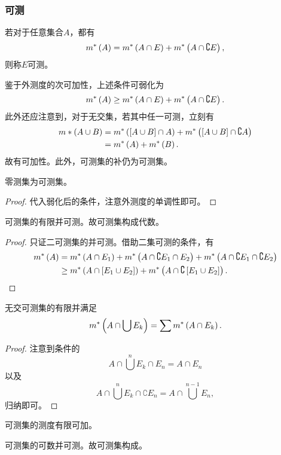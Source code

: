 \documentclass{ctexrep}
\begin{document}
  \subsubsection{\cara 可测}
  \begin{definition}
    若对于任意集合$A$，都有
    \[ m^*\left(A\right) = m^*\left(A\cap E\right)+m^*\left(A\cap\complement E\right), \]
    则称$E$可测。
  \end{definition}
  鉴于外测度的次可加性，上述条件可弱化为
  \[ m^*\left(A\right) \ge m^*\left(A\cap E\right)+m^*\left(A\cap\complement E\right). \]
  此外还应注意到，对于无交集，若其中任一可测，立刻有
  \begin{align*}
  m*\left(A\cup B\right) &= m^*\left(\left[A\cup B\right]\cap A\right)+m^*\left(\left[A\cup B\right]\cap \complement A\right)\\ &= m^*\left(A\right)+m^*\left(B\right).
  \end{align*}
  故有可加性。此外，可测集的补仍为可测集。
  \begin{theorem}
    零测集为可测集。
  \end{theorem}
  \begin{proof}
    代入弱化后的条件，注意外测度的单调性即可。
  \end{proof}
  \begin{theorem}
    可测集的有限并可测。故可测集构成代数。
  \end{theorem}
  \begin{proof}
    只证二可测集的并可测。借助二集可测的\cara 条件，有
    \begin{align*}
      m^*\left(A\right) &= m^*\left(A\cap E_1\right)+m^*\left(A\cap\complement E_1\cap E_2\right) + m^*\left(A\cap\complement E_1\cap \complement E_2\right) \\
      &\ge m^*\left(A\cap\left[E_1\cup E_2\right]\right) + m^*\left(A\cap\complement\left[E_1\cup E_2\right]\right).\qedhere
    \end{align*}
  \end{proof}
  \begin{theorem}
    无交可测集的有限并满足
    \[ m^*\left(A\cap\bigcup E_k\right) = \sum m^*\left(A\cap E_k\right). \]
  \end{theorem}
  \begin{proof}
    注意到\cara 条件的
    \[ A\cap\bigcup^n E_k \cap E_n = A \cap E_n \]
    以及
    \[ A\cap\bigcup^n E_k \cap \complement E_n = A\cap\bigcup^{n-1} E_n, \]
    归纳即可。
  \end{proof}
  \begin{collary}
    可测集的测度有限可加。
  \end{collary}
  \begin{theorem}
    可测集的可数并可测。故可测集构成\siga 。
  \end{theorem}
\end{document}

